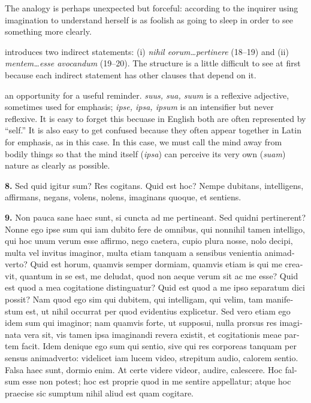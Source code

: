  The analogy is perhaps unexpected but forceful: according to the inquirer using imagination to understand herself is as foolish as going to sleep in order to see something more clearly.

 introduces two indirect statements: (i) \textit{nihil eorum\dots pertinere} (18--19) and (ii) \textit{mentem\dots esse avocandum} (19--20). The structure is a little difficult to see at first because each indirect statement has other clauses that depend on it.

 an opportunity for a useful reminder. \textit{suus, sua, suum} is a reflexive adjective, sometimes used for emphasis; \textit{ipse, ipsa, ipsum} is an intensifier but never reflexive. It is easy to forget this becuase in English both are often represented by ``self.'' It is also easy to get confused because they often appear together in Latin for emphasis, as in this case. In this case, we must call the mind away from bodily things so that the mind itself (\textit{ipsa}) can perceive its very own (\textit{suam}) nature as clearly as possible.

\clearpage

\beginnumbering
\pstart
\begin{latin}
    \textenglish{\textbf{8.}} Sed quid igitur sum? Res cogitans. Quid est hoc? Nempe dubitans, intelligens, affirmans, negans, volens, nolens, imaginans quoque, et sentiens.
\end{latin}
\pend
\endnumbering

\beginnumbering
\pstart
\begin{latin}
    \textenglish{\textbf{9.}} Non pauca sane haec sunt, si cuncta ad me pertineant. Sed quidni pertinerent? Nonne ego ipse sum qui iam dubito fere de omnibus, qui nonnihil tamen intelligo, qui hoc unum verum esse affirmo, nego caetera, cupio plura nosse, nolo decipi, multa vel invitus imaginor, multa etiam tanquam a sensibus venientia animadverto? Quid est horum, quamvis semper dormiam, quamvis etiam is qui me creavit, quantum in se est, me deludat, quod non aeque verum sit ac me esse? Quid est quod a mea cogitatione distinguatur? Quid est quod a me ipso separatum dici possit? Nam quod ego sim qui dubitem, qui intelligam, qui velim, tam manifestum est, ut nihil occurrat per quod evidentius explicetur. Sed vero etiam ego idem sum qui imaginor; nam quamvis forte, ut supposui, nulla prorsus res imaginata vera sit, vis tamen ipsa imaginandi revera existit, et cogitationis meae partem facit. Idem denique ego sum qui sentio, sive qui res corporeas tanquam per sensus animadverto: videlicet iam lucem video, strepitum audio, calorem sentio. Falsa haec sunt, dormio enim. At certe videre videor, audire, calescere. Hoc falsum esse non potest; hoc est proprie quod in me sentire appellatur; atque hoc praecise sic sumptum nihil aliud est quam cogitare.
\end{latin}
\pend
\endnumbering

